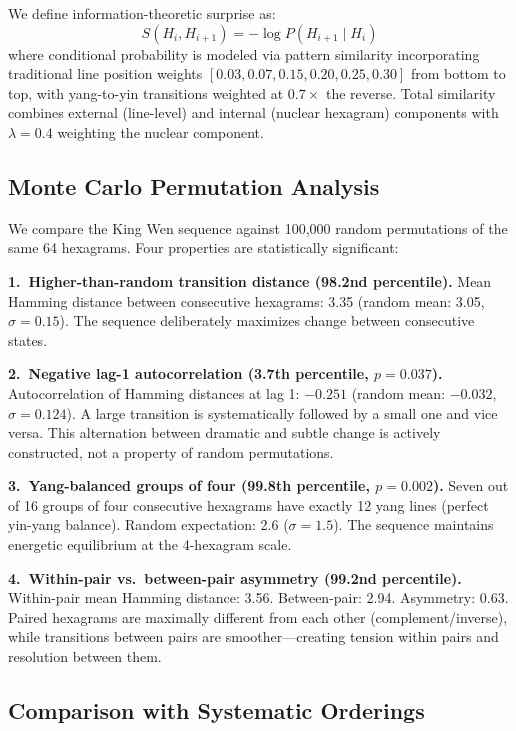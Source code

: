 \documentclass{article}
\begin{document}
We define information-theoretic surprise as:
\begin{equation}
S(H_i, H_{i+1}) = -\log P(H_{i+1} \mid H_i)
\end{equation}
where conditional probability is modeled via pattern similarity incorporating traditional line position weights $[0.03, 0.07, 0.15, 0.20, 0.25, 0.30]$ from bottom to top, with yang-to-yin transitions weighted at $0.7\times$ the reverse. Total similarity combines external (line-level) and internal (nuclear hexagram) components with $\lambda = 0.4$ weighting the nuclear component.

\subsection{Monte Carlo Permutation Analysis}

We compare the King Wen sequence against 100,000 random permutations of the same 64 hexagrams. Four properties are statistically significant:

\textbf{1.\ Higher-than-random transition distance (98.2nd percentile).} Mean Hamming distance between consecutive hexagrams: 3.35 (random mean: 3.05, $\sigma = 0.15$). The sequence deliberately maximizes change between consecutive states.

\textbf{2.\ Negative lag-1 autocorrelation (3.7th percentile, $p = 0.037$).} Autocorrelation of Hamming distances at lag 1: $-0.251$ (random mean: $-0.032$, $\sigma = 0.124$). A large transition is systematically followed by a small one and vice versa. This alternation between dramatic and subtle change is actively constructed, not a property of random permutations.

\textbf{3.\ Yang-balanced groups of four (99.8th percentile, $p = 0.002$).} Seven out of 16 groups of four consecutive hexagrams have exactly 12 yang lines (perfect yin-yang balance). Random expectation: 2.6 ($\sigma = 1.5$). The sequence maintains energetic equilibrium at the 4-hexagram scale.

\textbf{4.\ Within-pair vs.\ between-pair asymmetry (99.2nd percentile).} Within-pair mean Hamming distance: 3.56. Between-pair: 2.94. Asymmetry: 0.63. Paired hexagrams are maximally different from each other (complement/inverse), while transitions between pairs are smoother---creating tension within pairs and resolution between them.

\subsection{Comparison with Systematic Orderings}
\end{document}
